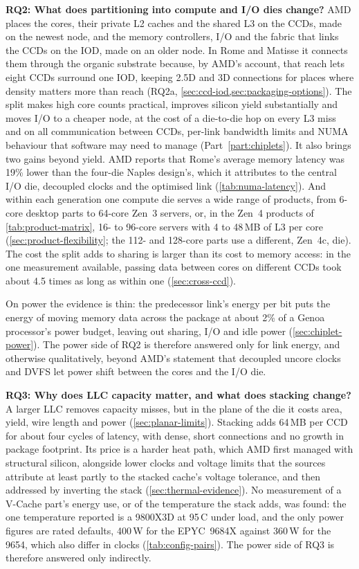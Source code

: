 \textbf{RQ2: What does partitioning into compute and I/O dies change?} AMD places the cores, their private L2 caches and the shared L3 on the CCDs, made on the newest node, and the memory controllers, I/O and the fabric that links the CCDs on the IOD, made on an older node. In Rome and Matisse it connects them through the organic substrate because, by AMD's account, that reach lets eight CCDs surround one IOD, keeping 2.5D and 3D connections for places where density matters more than reach (RQ2a, \cref{sec:ccd-iod,sec:packaging-options}). The split makes high core counts practical, improves silicon yield substantially and moves I/O to a cheaper node, at the cost of a die-to-die hop on every L3 miss and on all communication between CCDs, per-link bandwidth limits and NUMA behaviour that software may need to manage (Part~\ref{part:chiplets}). It also brings two gains beyond yield. AMD reports that Rome's average memory latency was 19\% lower than the four-die Naples design's, which it attributes to the central I/O die, decoupled clocks and the optimised link (\cref{tab:numa-latency}). And within each generation one compute die serves a wide range of products, from 6-core desktop parts to 64-core Zen~3 servers, or, in the Zen~4 products of \cref{tab:product-matrix}, 16- to 96-core servers with 4 to 48\,MB of L3 per core (\cref{sec:product-flexibility}; the 112- and 128-core parts use a different, Zen~4c, die). The cost the split adds to sharing is larger than its cost to memory access: in the one measurement available, passing data between cores on different CCDs took about 4.5 times as long as within one (\cref{sec:cross-ccd}). 

On power the evidence is thin: the predecessor link's energy per bit puts the energy of moving memory data across the package at about 2\% of a Genoa processor's power budget, leaving out sharing, I/O and idle power (\cref{sec:chiplet-power}). The power side of RQ2 is therefore answered only for link energy, and otherwise qualitatively, beyond AMD's statement that decoupled uncore clocks and DVFS let power shift between the cores and the I/O die.

\textbf{RQ3: Why does LLC capacity matter, and what does stacking change?} A larger LLC removes capacity misses, but in the plane of the die it costs area, yield, wire length and power (\cref{sec:planar-limits}). Stacking adds 64\,MB per CCD for about four cycles of latency, with dense, short connections and no growth in package footprint. Its price is a harder heat path, which AMD first managed with structural silicon, alongside lower clocks and voltage limits that the sources attribute at least partly to the stacked cache's voltage tolerance, and then addressed by inverting the stack (\cref{sec:thermal-evidence}). No measurement of a V-Cache part's energy use, or of the temperature the stack adds, was found: the one temperature reported is a 9800X3D at 95\,\textdegree C under load, and the only power figures are rated defaults, 400\,W for the EPYC~9684X against 360\,W for the 9654, which also differ in clocks (\cref{tab:config-pairs}). The power side of RQ3 is therefore answered only indirectly.

